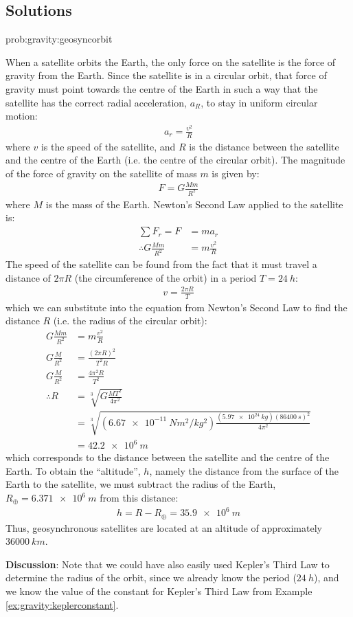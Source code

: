 \newpage
\subsection{Solutions}
\begin{solution}{prob:gravity:geosyncorbit}\label{soln:gravity:geosyncorbit}
{When a satellite orbits the Earth, the only force on the satellite is the force of gravity from the Earth. Since the satellite is in a circular orbit, that force of gravity must point towards the centre of the Earth in such a way that the satellite has the correct radial acceleration, $a_R$, to stay in uniform circular motion:
\begin{align*}
a_r=\frac{v^2}{R}
\end{align*}
where $v$ is the speed of the satellite, and $R$ is the distance between the satellite and the centre of the Earth (i.e. the centre of the circular orbit). The magnitude of the force of gravity on the satellite of mass $m$ is given by:
\begin{align*}
F = G\frac{Mm}{R^2}
\end{align*}
where $M$ is the mass of the Earth. Newton's Second Law applied to the satellite is:
\begin{align*}
\sum F_r = F &= ma_r\\
\therefore G\frac{Mm}{R^2}&=m\frac{v^2}{R}
\end{align*}
The speed of the satellite can be found from the fact that it must travel a distance of $2\pi R$ (the circumference of the orbit) in a period $T=\SI{24}{h}$:
\begin{align*}
v=\frac{2\pi R}{T}
\end{align*}
which we can substitute into the equation from Newton's Second Law to find the distance $R$ (i.e. the radius of the circular orbit):
\begin{align*}
G\frac{Mm}{R^2}&=m\frac{v^2}{R}\\
G\frac{M}{R^2}&=\frac{(2\pi R)^2}{T^2R}\\ 
G\frac{M}{R^2}&=\frac{4\pi^2 R}{T^2}\\ 
\therefore R&=\sqrt[3]{G\frac{MT^2}{4\pi^2}}\\
&=\sqrt[3]{(\SI{6.67e-11}{Nm^2/kg^2})\frac{(\SI{5.97e24}{kg})(\SI{86400}{s})^2}{4\pi^2}}\\
&=\SI{42.2e6}{m}
\end{align*}
which corresponds to the distance between the satellite and the centre of the Earth. To obtain the ``altitude'', $h$, namely the distance from the surface of the Earth to the satellite, we must subtract the radius of the Earth, $R_\oplus=\SI{6.371e6}{m}$ from this distance:
\begin{align*}
h = R-R_\oplus = \SI{35.9e6}{m}
\end{align*}
Thus, geosynchronous satellites are located at an altitude of approximately $\SI{36000}{km}$.

\textbf{Discussion}: Note that we could have also easily used Kepler's Third Law to determine the radius of the orbit, since we already know the period ($\SI{24}{h}$), and we know the value of the constant for Kepler's Third Law from Example \ref{ex:gravity:keplerconstant}.
}
\end{solution}

